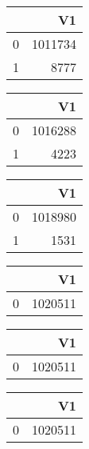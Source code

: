 \bigskip\bigskip
\centering
\begin{tabular}{rr}
  \hline
 & V1 \\ 
  \hline
0 & 1011734 \\ 
  1 & 8777 \\ 
   \hline
\end{tabular}

\bigskip\bigskip
\centering
\begin{tabular}{rr}
  \hline
 & V1 \\ 
  \hline
0 & 1016288 \\ 
  1 & 4223 \\ 
   \hline
\end{tabular}

\bigskip\bigskip
\centering
\begin{tabular}{rr}
  \hline
 & V1 \\ 
  \hline
0 & 1018980 \\ 
  1 & 1531 \\ 
   \hline
\end{tabular}

\bigskip\bigskip
\centering
\begin{tabular}{rr}
  \hline
 & V1 \\ 
  \hline
0 & 1020511 \\ 
   \hline
\end{tabular}

\bigskip\bigskip
\centering
\begin{tabular}{rr}
  \hline
 & V1 \\ 
  \hline
0 & 1020511 \\ 
   \hline
\end{tabular}

\bigskip\bigskip
\centering
\begin{tabular}{rr}
  \hline
 & V1 \\ 
  \hline
0 & 1020511 \\ 
   \hline
\end{tabular}

